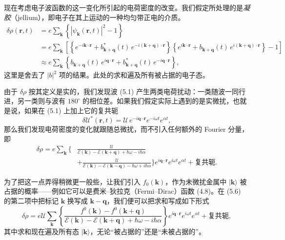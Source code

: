 现在考虑电子波函数的这一变化所引起的电荷密度的改变。我们假定所处理的是\emph{凝胶}（jellium），即电子在其上运动的一种均匀带正电的介质。
\begin{align*}
\delta\rho(\mathbf{r},t)&=e\sum_{\mathbf{k}}\left\{\left|\psi_{\mathbf{k}}(\mathbf{r},t)\right|^{2}-1\right\}\\
&=e\sum_{\mathbf{k}}\left[\left\{e^{-i\mathbf{k}\cdot\mathbf{r}}+b_{\mathbf{k}+\mathbf{q}}^{*}(t)\,e^{-i(\mathbf{k}+\mathbf{q})\cdot\mathbf{r}}\right\}\left\{e^{i\mathbf{k}\cdot\mathbf{r}}+b_{\mathbf{k}+\mathbf{q}}(t)\,e^{i(\mathbf{k}+\mathbf{q})\cdot\mathbf{r}}\right\}-1\right]\\
&\approx e\sum_{\mathbf{k}}\left\{b_{\mathbf{k}+\mathbf{q}}(t)\,e^{i\mathbf{q}\cdot\mathbf{r}}+b_{\mathbf{k}+\mathbf{q}}^{*}(t)\,e^{-i\mathbf{q}\cdot\mathbf{r}}\right\},
\tag{5.4}
\end{align*}
这里是舍去了 $|b|^{2}$ 项的结果。此处的求和遍及所有被占据的电子态。

由于 $\delta\rho$ 按其定义是实的，我们发现波 (5.1) 产生两类电荷扰动：一类随波一同行进，另一类则与波有 $180^{\circ}$ 的相位差。如果我们假定实际上遇到的是实微扰，也就是说，如果在 (5.1) 上加上它的复共轭
\begin{equation*}
\delta\mathcal{U}^{*}(\mathbf{r},t)=\mathcal{U}\,e^{-i\mathbf{q}\cdot\mathbf{r}}e^{-i\omega t}e^{\alpha t},
\tag{5.5}
\end{equation*}
那么我们发现电荷密度的变化就跟随总微扰，而不引入任何额外的 Fourier 分量，即
\begin{align*}
\delta\rho=e\sum_{\mathbf{k}}\bigg\{&\frac{\mathcal{U}}{\mathcal{E}(\mathbf{k})-\mathcal{E}(\mathbf{k}+\mathbf{q})+\hbar\omega-i\hbar\alpha}\\
&+\frac{\mathcal{U}}{\mathcal{E}(\mathbf{k})-\mathcal{E}(\mathbf{k}-\mathbf{q})-\hbar\omega+i\hbar\alpha}\bigg\}e^{i\mathbf{q}\cdot\mathbf{r}}e^{i\omega t}e^{\alpha t}+\text{复共轭}.
\tag{5.6}
\end{align*}

为了把这一点弄得稍微更一般些，让我们引入 $f_{0}(\mathbf{k})$，作为未微扰金属中 $|\mathbf{k}\rangle$ 被占据的概率——例如它可以是费米--狄拉克（Fermi--Dirac）函数 (4.8)。在 (5.6) 的第二项中把标记 $\mathbf{k}$ 换写成 $\mathbf{k}-\mathbf{q}$，我们便可以把求和写成如下形式
\begin{equation*}
\delta\rho=e\mathcal{U}\sum_{\mathbf{k}}\left\{\frac{f^{0}(\mathbf{k})-f^{0}(\mathbf{k}+\mathbf{q})}{\mathcal{E}(\mathbf{k})-\mathcal{E}(\mathbf{k}+\mathbf{q})+\hbar\omega-i\hbar\alpha}\right\}e^{i\mathbf{q}\cdot\mathbf{r}}e^{i\omega t}e^{\alpha t}+\text{复共轭},
\tag{5.7}
\end{equation*}
其中求和现在遍及所有态 $|\mathbf{k}\rangle$，无论“被占据的”还是“未被占据的”。

